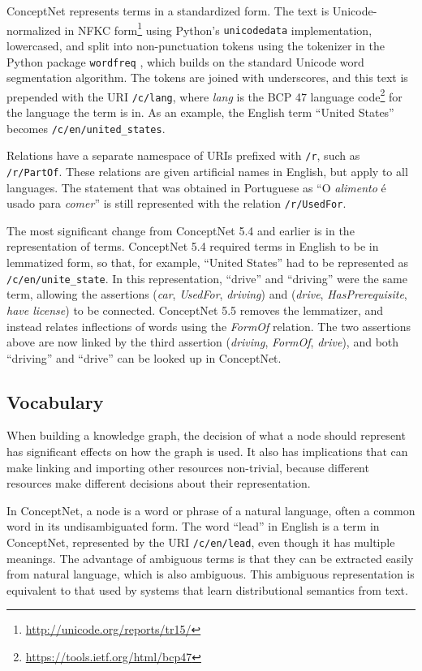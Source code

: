 \documentclass[letterpaper]{article}
\begin{document}
ConceptNet represents terms in a standardized form. The text is
Unicode-normalized in NFKC form\footnote{\url{http://unicode.org/reports/tr15/}}
using Python's {\tt unicodedata} implementation, lowercased, and split into non-punctuation tokens
using the tokenizer in the Python package \texttt{wordfreq}
\cite{speer2016wordfreq}, which builds on the standard Unicode word
segmentation algorithm. The tokens are joined with underscores, and this text
is prepended with the URI \texttt{/c/lang}, where \emph{lang} is the BCP 47
language code\footnote{\url{https://tools.ietf.org/html/bcp47}} for the language the term is in. As an example, the English term
``United States'' becomes \texttt{/c/en/united\_states}.

Relations have a separate namespace of URIs prefixed with \texttt{/r}, such as
\texttt{/r/PartOf}. These relations are given artificial names in English, but
apply to all languages. The statement that was obtained in Portuguese as ``O
\emph{alimento} é usado para \emph{comer}'' is still represented with the
relation \texttt{/r/UsedFor}.

The most significant change from ConceptNet 5.4 and earlier is in the
representation of terms. ConceptNet 5.4 required terms in English to be in
lemmatized form, so that, for example, ``United States'' had to be represented
as \texttt{/c/en/unite\_state}. In this representation, ``drive'' and
``driving'' were the same term, allowing the assertions (\emph{car},
\emph{UsedFor}, \emph{driving}) and (\emph{drive}, \emph{HasPrerequisite},
\emph{have license}) to be connected. ConceptNet 5.5 removes the lemmatizer,
and instead relates inflections of words using the \emph{FormOf} relation. The
two assertions above are now linked by the third assertion (\emph{driving},
\emph{FormOf}, \emph{drive}), and both ``driving'' and ``drive'' can be looked
up in ConceptNet.

\subsection{Vocabulary}\label{vocabulary}

When building a knowledge graph, the decision of what a node should
represent has significant effects on how the graph is used. It also has
implications that can make linking and importing other resources
non-trivial, because different resources make different decisions about
their representation.

In ConceptNet, a node is a word or phrase of a natural language, often a common
word in its undisambiguated form. The word ``lead'' in English is a term in
ConceptNet, represented by the URI \texttt{/c/en/lead}, even though it has
multiple meanings. The advantage of ambiguous terms is that they can be
extracted easily from natural language, which is also ambiguous. This ambiguous
representation is equivalent to that used by systems that learn distributional
semantics from text.
\end{document}
